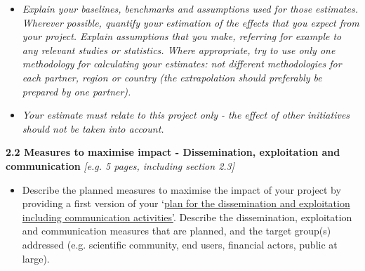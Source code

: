 \begin{itemize}
\item
  \emph{Explain your baselines, benchmarks and assumptions used for
  those estimates. Wherever possible, quantify your estimation of the
  effects that you expect from your project. Explain assumptions that
  you make, referring for example to any relevant studies or statistics.
  Where appropriate, try to use only one methodology for calculating
  your estimates: not different methodologies for each partner, region
  or country (the extrapolation should preferably be prepared by one
  partner).}
\item
  \emph{Your estimate must relate to this project only - the effect of
  other initiatives should not be taken into account.}
\end{itemize}

\textbf{2.2 Measures to maximise impact - Dissemination, exploitation
and communication }\emph{{[}e.g. 5 pages, including section 2.3{]}}

\begin{itemize}
\item
  Describe the planned measures to maximise the impact of your project
  by providing a first version of your `\uline{plan for the
  dissemination and exploitation including communication activities'}.
  Describe the dissemination, exploitation and communication measures
  that are planned, and the target group(s) addressed (e.g. scientific
  community, end users, financial actors, public at large).
\end{itemize}

